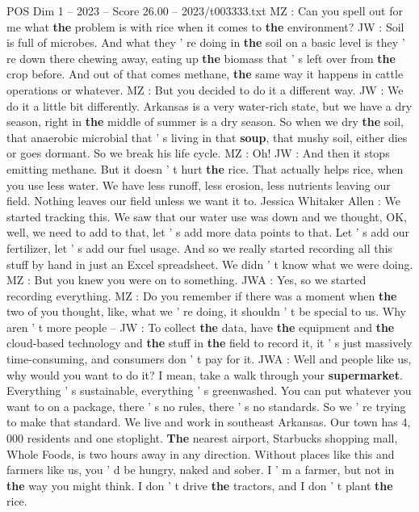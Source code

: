 \begin{textsample}{POS Dim 1 – 2023 – Score 26.00 – 2023/t003333.txt}
MZ : Can you spell out for me what \textbf{the} problem is with rice when it comes to \textbf{the} environment?
JW : Soil is full of microbes.
And what they ' re doing in \textbf{the} soil on a basic level is they ' re down there chewing away, eating up \textbf{the} biomass that ' s left over from \textbf{the} crop before.
And out of that comes methane, \textbf{the} same way it happens in cattle operations or whatever.
MZ : But you decided to do it a different way.
JW : We do it a little bit differently.
Arkansas is a very water-rich state, but we have a dry season, right in \textbf{the} middle of summer is a dry season.
So when we dry \textbf{the} soil, that anaerobic microbial that ' s living in that \textbf{soup}, that mushy soil, either dies or goes dormant.
So we break his life cycle.
MZ : Oh!
JW : And then it stops emitting methane.
But it doesn ' t hurt \textbf{the} rice.
That actually helps rice, when you use less water.
We have less runoff, less erosion, less nutrients leaving our field.
Nothing leaves our field unless we want it to.
Jessica Whitaker Allen : We started tracking this.
We saw that our water use was down and we thought, OK, well, we need to add to that, let ' s add more data points to that.
Let ' s add our fertilizer, let ' s add our fuel usage.
And so we really started recording all this stuff by hand in just an Excel spreadsheet.
We didn ' t know what we were doing.
MZ : But you knew you were on to something.
JWA : Yes, so we started recording everything.
MZ : Do you remember if there was a moment when \textbf{the} two of you thought, like, what we ' re doing, it shouldn ' t be special to us.
Why aren ' t more people -- JW : To collect \textbf{the} data, have \textbf{the} equipment and \textbf{the} cloud-based technology and \textbf{the} stuff in \textbf{the} field to record it, it ' s just massively time-consuming, and consumers don ' t pay for it.
JWA : Well and people like us, why would you want to do it?
I mean, take a walk through your \textbf{supermarket}.
Everything ' s sustainable, everything ' s greenwashed.
You can put whatever you want to on a package, there ' s no rules, there ' s no standards.
So we ' re trying to make that standard.
We live and work in southeast Arkansas.
Our town has 4, 000 residents and one stoplight. \textbf{The} nearest airport, Starbucks shopping mall, Whole Foods, is two hours away in any direction.
Without places like this and farmers like us, you ' d be hungry, naked and sober.
I ' m a farmer, but not in \textbf{the} way you might think.
I don ' t drive \textbf{the} tractors, and I don ' t plant \textbf{the} rice.

\end{textsample}
